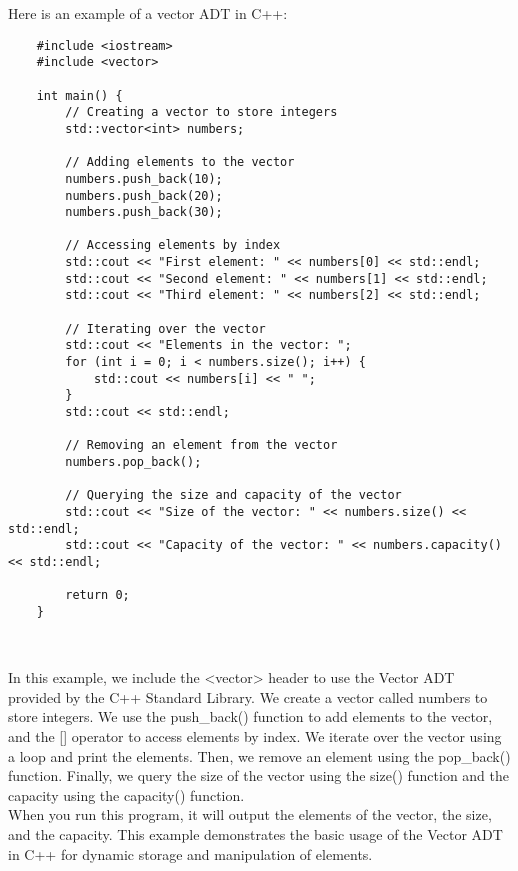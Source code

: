 \begin{solution}
    Here is an example of a vector ADT in C++: \\
    \horizontalline
    \begin{verbatim}
    #include <iostream>
    #include <vector>
    
    int main() {
        // Creating a vector to store integers
        std::vector<int> numbers;
    
        // Adding elements to the vector
        numbers.push_back(10);
        numbers.push_back(20);
        numbers.push_back(30);
    
        // Accessing elements by index
        std::cout << "First element: " << numbers[0] << std::endl;
        std::cout << "Second element: " << numbers[1] << std::endl;
        std::cout << "Third element: " << numbers[2] << std::endl;
    
        // Iterating over the vector
        std::cout << "Elements in the vector: ";
        for (int i = 0; i < numbers.size(); i++) {
            std::cout << numbers[i] << " ";
        }
        std::cout << std::endl;
    
        // Removing an element from the vector
        numbers.pop_back();
    
        // Querying the size and capacity of the vector
        std::cout << "Size of the vector: " << numbers.size() << std::endl;
        std::cout << "Capacity of the vector: " << numbers.capacity() << std::endl;
    
        return 0;
    }
    \end{verbatim} \\
    \horizontalline

    In this example, we include the <vector> header to use the Vector ADT provided by the C++ Standard Library. We create a vector called numbers to store integers. We use the push\_back() function to add elements to the vector, and the [] operator to access elements by index. We iterate over the vector using a loop and print the 
    elements. Then, we remove an element using the pop\_back() function. Finally, we query the size of the vector using the size() function and the capacity using the capacity() function. \\

    \noindent When you run this program, it will output the elements of the vector, the size, and the capacity. This example demonstrates the basic usage of the Vector ADT in C++ for dynamic storage and manipulation of elements. \\
\end{solution}

